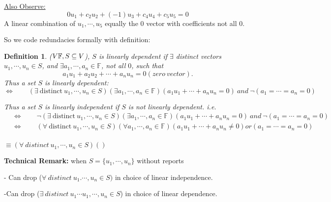 \documentclass[12pt]{article}
\theoremstyle{plain}
\newtheorem{definition}{Definition}[subsection]
\newcommand{\mF}{{\mathbb{F}}}
\begin{document}
	\underline{Also Observe: }
	\[
		0u_1 + c_2u_2 + (-1)u_3 + c_4u_4 + c_5u_5 = 0
	\]
	A linear combination of $u_1,\cdots,u_5$ equally the 0 vector with 
	coefficients not all $0$. 

	So we code redundacies formally with definition: 

	\begin{definition}
		($V \/ \mF, S\subseteq V$), $S$ is linearly dependent if $\exists$
		distinct vectors $u_1, \cdots, u_n \in S$, and $\exists a_1, \cdots, a_n
		\in \mF$, not all $0$, such that 
		\[
			a_1u_1+a_2u_2+\cdots+a_nu_n = 0 (zero \ vector). 
		\]
		Thus a set $S$ is linearly dependent: 
		\[
			\Leftrightarrow\qquad 
			(\exists \ \text{distinct} \ u_1,\cdots, u_n \in S)
			(\exists a_1, \cdots, a_n \in \mF)
			(a_1u_1 + \cdots + a_nu_n = 0) \ and \
			\neg(a_1 = \cdots = a_n = 0)
		\]

		Thus a set $S$ is linearly independent if $S$ is not linearly dependent.
		i.e. 
		\begin{align*}
			&\Leftrightarrow \qquad 
			\neg (\exists \ \text{distinct} \ u_1,\cdots, u_n \in S)
			(\exists a_1, \cdots, a_n \in \mF)
			(a_1u_1 + \cdots + a_nu_n = 0) \ and \
			\neg(a_1 = \cdots = a_n = 0)\\
			&\Leftrightarrow \qquad 
			(\forall \ \text{distinct} \ u_1,\cdots, u_n \in S)
			(\forall a_1, \cdots, a_n \in \mF)
			(a_1u_1 + \cdots + a_nu_n \neq 0) or
			(a_1 = \cdots = a_n = 0)\\
		\end{align*}
		
	$\equiv (\forall \ distinct \ u_1, \cdots, u_n \in S)()$\\
	\end{definition}

	\textbf{Technical Remark: }
	when $S = \{u_1, \cdots, u_n\}$ without reports

	- Can drop ($\forall \ distinct \ u_1. \cdots, u_n \in S)$ in choice of 
	linear independence. 

	-Can drop ($\exists \ distinct \ u_1\cdots u_1, \cdots, u_n \in S$) in 
	choice of linear dependence. \\
\end{document}

